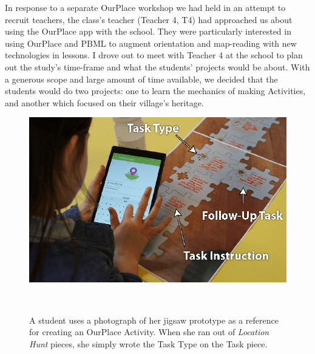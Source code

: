 In response to a separate OurPlace workshop we had held in an attempt to recruit teachers, the class's teacher (Teacher 4, T4) had approached us about using the OurPlace app with the school. They were particularly interested in using OurPlace and PBML to augment orientation and map-reading with new technologies in lessons. I drove out to meet with Teacher 4 at the school to plan out the study's time-frame and what the students' projects would be about. With a generous scope and large amount of time available, we decided that the students would do two projects: one to learn the mechanics of making Activities, and another which focused on their village's heritage. 

\begin{figure}
\centering
  \includegraphics[width=0.7\columnwidth]{images/chapter08/jigsawToApp}
  \caption[A student referring to her paper prototype]{A student uses a photograph of her jigsaw prototype as a reference for creating an OurPlace Activity. When she ran out of \textit{Location Hunt} pieces, she simply wrote the Task Type on the Task piece.}~\label{fig:JigsawToApp}
\end{figure}

